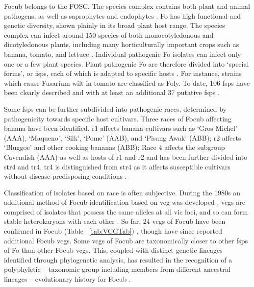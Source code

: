 \ac{Focub} belongs to the \ac{FOSC}. The species complex contains both plant and animal pathogens, as well as saprophytes and endophytes \parencite{Leslie2006}. \acs{Fo} has high functional and genetic diversity, shown plainly in its broad plant host range. The species complex can infect around 150 species of both monocotyledonous and dicotyledonous plants, including many horticulturally important crops such as banana, tomato, and lettuce \parencite{Edel-Hermann2019}.  Individual pathogenic \ac{Fo} isolates can infect only one or a few plant species. Plant pathogenic \ac{Fo} are therefore divided into ‘special forms’, or \acp{fsp}, each of which is adapted to specific hosts \parencite{Snyder1940}. For instance, strains which cause Fusarium wilt in tomato are classified as \acl{Foly}. To date, 106 \acp{fsp} have been clearly described and with at least an additional 37 putative \acp{fsp} \parencite{Edel-Hermann2019}.   

Some \acp{fsp} can be further subdivided into pathogenic races, determined by pathogenicity towards specific host cultivars. Three races of \ac{Focub} affecting banana have been identified. \acf{r1}  affects banana cultivars such as ‘Gros Michel’ (AAA), ‘Maqueno’, ‘Silk’, ‘Pome’ (AAB), and ‘Pisang Awak’ (ABB); \acf{r2} affects ‘Bluggoe’ and other cooking bananas (ABB); Race 4 affects the subgroup Cavendish (AAA) as well as hosts of \ac{r1} and \ac{r2} \parencite{Ploetz2015a} and has been further divided into \ac{str4} and \acl{tr4}. \Ac{tr4} is distinguished from \ac{str4} as it affects susceptible cultivars without disease-predisposing conditions \parencite{Ploetz2015b}.  

Classification of isolates based on race is often subjective. During the 1980s an additional method of \ac{Focub} identification based on \ac{vcg} was developed \parencite{Correll1991}. \acp{vcg} are comprised of isolates that possess the same alleles at all \ac{vic} loci, and so can form stable heterokaryons with each other \parencite{Correll1991}. So far, 24 \acp{vcg} of \ac{Focub} have been confirmed in \ac{Focub} (Table ~\ref{tab:VCGTab}) \parencite{Czislowski2018}, though \textcite{Mostert2022} have since reported additional \ac{Focub} \acp{vcg}. Some \acp{vcg} of \ac{Focub} are taxonomically closer to other \acp{fsp} of \ac{Fo} than other \ac{Focub} \acp{vcg}. This, coupled with distinct genetic lineages identified through phylogenetic analysis, has resulted in the recognition of a polyphyletic – taxonomic group including members from different ancestral lineages – evolutionary history for \ac{Focub} \parencite{Koenig1997, Ploetz2007}. 

